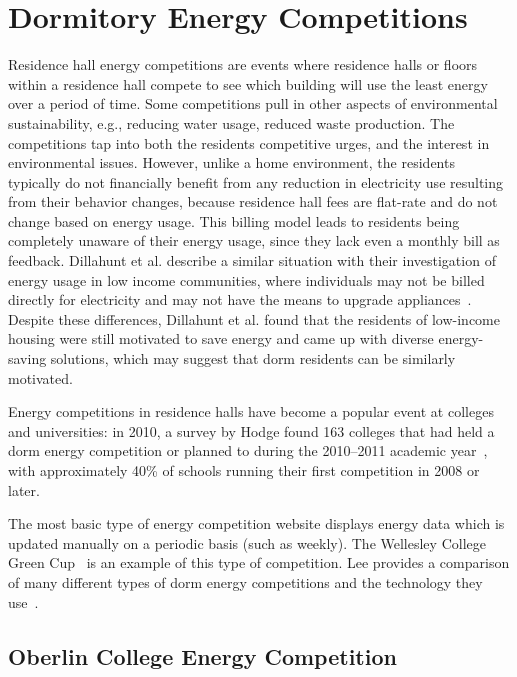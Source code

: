 \section{Dormitory Energy Competitions}
\label{sec:dorm-energy-competitions}

Residence hall energy competitions are events where residence halls or floors within a residence hall compete to see which building will use the least energy over a period of time. Some competitions pull in other aspects of environmental sustainability, e.g., reducing water usage, reduced waste production. The competitions tap into both the residents competitive urges, and the interest in environmental issues. However, unlike a home environment, the residents typically do not financially benefit from any reduction in electricity use resulting from their behavior changes, because residence hall fees are flat-rate and do not change based on energy usage. This billing model leads to residents being completely unaware of their energy usage, since they lack even a monthly bill as feedback. Dillahunt et al. describe a similar situation with their investigation of energy usage in low income communities, where individuals may not be billed directly for electricity and may not have the means to upgrade appliances~\cite{Dillahunt2009-low-income}. Despite these differences, Dillahunt et al. found that the residents of low-income housing were still motivated to save energy and came up with diverse energy-saving solutions, which may suggest that dorm residents can be similarly motivated.

Energy competitions in residence halls have become a popular event at colleges and universities: in 2010, a survey by Hodge found 163 colleges that had held a dorm energy competition or planned to during the 2010--2011 academic year~\cite{Hodge2010}, with approximately 40\% of schools running their first competition in 2008 or later.

The most basic type of energy competition website displays energy data which is updated manually on a periodic basis (such as weekly). The Wellesley College Green Cup~\cite{wellesley-green-cup} is an example of this type of competition. Lee provides a comparison of many different types of dorm energy competitions and the technology they use~\cite[pp. 6--11]{csdl2-11-01}.

\subsection{Oberlin College Energy Competition}

